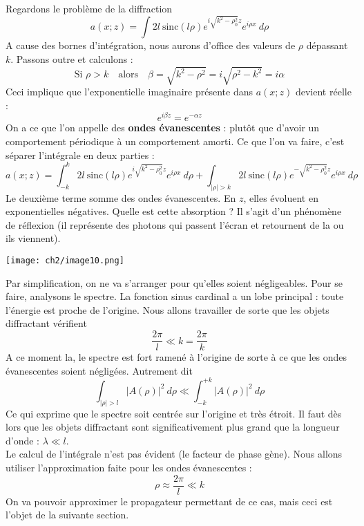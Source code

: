 \begin{enumerate}
Regardons le problème de la diffraction
\begin{equation}
a(x;z) = \int 2l\ \text{sinc}(l\rho)e^{i\sqrt{k^2-\rho_0^2}z}e^{i\rho x}\ d\rho
\end{equation}
A cause des bornes d'intégration, nous aurons d'office des valeurs de $\rho$ dépassant 
$k$. Passons outre et calculons :
\begin{equation}
\text{Si } \rho > k\quad \text{alors}\quad \beta = \sqrt{k^2-\rho^2} = i\sqrt{\rho^2-k^2} = 
i\alpha
\end{equation}
Ceci implique que l'exponentielle imaginaire présente dans $a(x;z)$ devient réelle :
\begin{equation}
e^{i\beta z} = e^{-\alpha z}
\end{equation}
On a ce que l'on appelle des \textbf{ondes évanescentes} : plutôt que d'avoir un comportement 
périodique à un comportement amorti. Ce que l'on va faire, c'est séparer l’intégrale en deux 
parties :
\begin{equation}
a(x;z) = \int_{-k}^k  2l\ \text{sinc}(l\rho)e^{i\sqrt{k^2-\rho_0^2}z}e^{i\rho x}\ d\rho + 
\int_{|\rho|>k}  2l\ \text{sinc}(l\rho)e^{-\sqrt{k^2-\rho_0^2}z}e^{i\rho x}\ d\rho
\end{equation}
Le deuxième terme somme des ondes évanescentes. En $z$, elles évoluent en exponentielles 
négatives. Quelle est cette absorption ? Il s'agit d'un phénomène de réflexion (il représente 
des photons qui passent l'écran et retournent de la ou ils viennent). 

\begin{center}
\texttt{[image: ch2/image10.png]}
\end{center}
Par simplification, 
on ne va s'arranger pour qu'elles soient négligeables. Pour se faire, analysons le spectre. 
La fonction sinus cardinal a un lobe principal : toute l'énergie est proche de l'origine. Nous 
allons travailler de sorte que les objets diffractant vérifient
\begin{equation}
\dfrac{2\pi}{l} \ll k = \dfrac{2\pi}{k}
\end{equation}
A ce moment la, le spectre est fort ramené à l'origine de sorte à ce que les ondes évanescentes 
soient négligées. Autrement dit
\begin{equation}
\int_{|\rho|>l} |A(\rho)|^2\ d\rho \ll \int_{-k}^{+k} |A(\rho)|^2\ d\rho
\end{equation}
Ce qui exprime que le spectre soit centrée sur l'origine et très étroit. Il faut dès lors que 
les objets diffractant sont significativement plus grand que la longueur d'onde : $\lambda \ll l$.\\

Le calcul de l'intégrale n'est pas évident (le facteur de phase gène). Nous allons utiliser 
l'approximation faite pour les ondes évanescentes :
\begin{equation}
\rho \approx \dfrac{2\pi}{l} \ll k
\end{equation}
On va pouvoir approximer le propagateur permettant de  ce cas, mais ceci est l'objet de la 
suivante section.
\end{enumerate}

